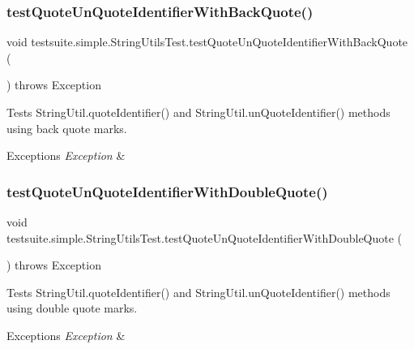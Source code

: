\subsubsection{\texorpdfstring{test\+Quote\+Un\+Quote\+Identifier\+With\+Back\+Quote()}{testQuoteUnQuoteIdentifierWithBackQuote()}}
{\footnotesize\ttfamily void testsuite.\+simple.\+String\+Utils\+Test.\+test\+Quote\+Un\+Quote\+Identifier\+With\+Back\+Quote (\begin{DoxyParamCaption}{ }\end{DoxyParamCaption}) throws Exception}

Tests String\+Util.\+quote\+Identifier() and String\+Util.\+un\+Quote\+Identifier() methods using back quote marks.


\begin{DoxyExceptions}{Exceptions}
{\em Exception} & \\
\hline
\end{DoxyExceptions}
\mbox{\label{classtestsuite_1_1simple_1_1_string_utils_test_adb8f4c412143b740afd9fe6c70018660}} 
\subsubsection{\texorpdfstring{test\+Quote\+Un\+Quote\+Identifier\+With\+Double\+Quote()}{testQuoteUnQuoteIdentifierWithDoubleQuote()}}
{\footnotesize\ttfamily void testsuite.\+simple.\+String\+Utils\+Test.\+test\+Quote\+Un\+Quote\+Identifier\+With\+Double\+Quote (\begin{DoxyParamCaption}{ }\end{DoxyParamCaption}) throws Exception}

Tests String\+Util.\+quote\+Identifier() and String\+Util.\+un\+Quote\+Identifier() methods using double quote marks.


\begin{DoxyExceptions}{Exceptions}
{\em Exception} & \\
\hline
\end{DoxyExceptions}
\mbox{\label{classtestsuite_1_1simple_1_1_string_utils_test_a535b80b532dc2f62828f79c5fec8605f}} 
